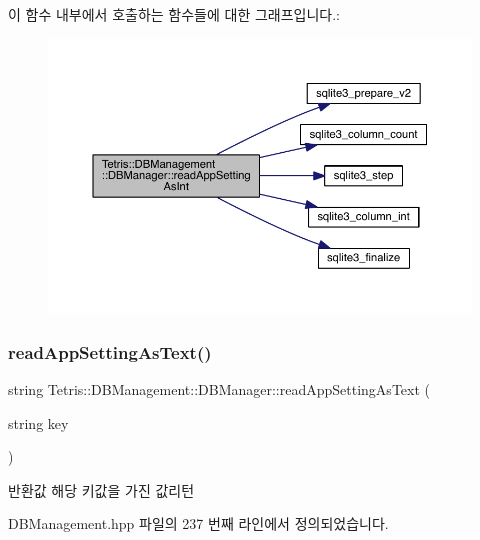 이 함수 내부에서 호출하는 함수들에 대한 그래프입니다.\+:
\nopagebreak
\begin{figure}[H]
\begin{center}
\leavevmode
\includegraphics[width=350pt]{class_tetris_1_1_d_b_management_1_1_d_b_manager_ac52daf6ea2310b848278454c30698436_cgraph}
\end{center}
\end{figure}
\mbox{\label{class_tetris_1_1_d_b_management_1_1_d_b_manager_acb213c517f06d1eadafd45a86b91c2ff}} 
\subsubsection{\texorpdfstring{read\+App\+Setting\+As\+Text()}{readAppSettingAsText()}}
{\footnotesize\ttfamily string Tetris\+::\+D\+B\+Management\+::\+D\+B\+Manager\+::read\+App\+Setting\+As\+Text (\begin{DoxyParamCaption}\item[{string}]{key }\end{DoxyParamCaption})\hspace{0.3cm}{\ttfamily [inline]}}

\begin{DoxyReturn}{반환값}
해당 키값을 가진 값리턴 
\end{DoxyReturn}


D\+B\+Management.\+hpp 파일의 237 번째 라인에서 정의되었습니다.

